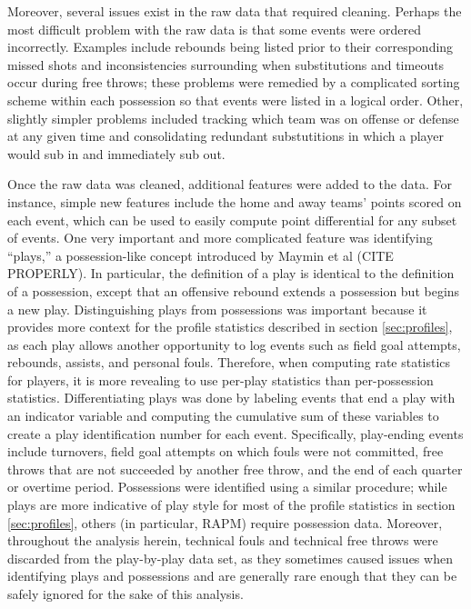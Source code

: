 Moreover, several issues exist in the raw data that required cleaning. Perhaps the
most difficult problem with the raw data is that some events were ordered
incorrectly. Examples include rebounds being listed prior to their corresponding
missed shots and inconsistencies surrounding when substitutions and timeouts occur
during free throws; these problems were remedied by a complicated sorting scheme
within each possession so that events were listed in a logical order. Other,
slightly simpler problems included tracking which team was on offense or defense at
any given time and consolidating redundant substutitions in which a player would sub
in and immediately sub out.

Once the raw data was cleaned, additional features were added to the data. For
instance, simple new features include the home and away teams' points scored on each
event, which can be used to easily compute point differential for any subset of
events. One very important and more complicated feature was identifying ``plays,'' a
possession-like concept introduced by Maymin et al (CITE PROPERLY). In particular,
the definition of a play is identical to the definition of a possession, except that
an offensive rebound extends a possession but begins a new play. Distinguishing
plays from possessions was important because it provides more context for the
profile statistics described in section \ref{sec:profiles}, as each play allows
another opportunity to log events such as field goal attempts, rebounds, assists,
and personal fouls. Therefore, when computing rate statistics for players, it is
more revealing to use per-play statistics than per-possession statistics.
Differentiating plays was done by labeling events that end a play with an indicator
variable and computing the cumulative sum of these variables to create a play
identification number for each event. Specifically, play-ending events include
turnovers, field goal attempts on which fouls were not committed, free throws that
are not succeeded by another free throw, and the end of each quarter or overtime
period. Possessions were identified using a similar procedure; while plays are more
indicative of play style for most of the profile statistics in section
\ref{sec:profiles}, others (in particular, RAPM) require possession data. Moreover,
throughout the analysis herein, technical fouls and technical free throws were
discarded from the play-by-play data set, as they sometimes caused issues when
identifying plays and possessions and are generally rare enough that they can be
safely ignored for the sake of this analysis.

